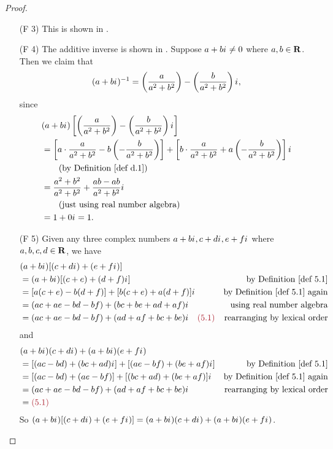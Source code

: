 \begin{proof}
\begin{enumerate}
\item[(F 3)] This is shown in .

\item[(F 4)] The additive inverse is shown in .
Suppose \(a + b{i\mkern1mu} \ne 0\) where \(a, b \in \mathbf{R}\).
Then we claim that
\[
    (a + b{i\mkern1mu})^{-1} = \left( \frac{a}{a^2 + b^2} \right) - \left( \frac{b}{a^2 + b^2} \right){i\mkern1mu},
\]
since
\begin{align*}
    & (a + b\iu) \left[ \left( \frac{a}{a^2 + b^2} \right) - \left( \frac{b}{a^2 + b^2} \right)\iu \right] \\
    & = \left[ a \cdot \frac{a}{a^2 + b^2} - b \left( - \frac{b}{a^2 + b^2} \right) \right] + \left[ b \cdot \frac{a}{a^2 + b^2} + a \left( - \frac{b}{a^2 + b^2} \right) \right] \iu \\
    & \quad \quad \text{(by \DEF{d.1})} \\
    & = \frac{a^2 + b^2}{a^2 + b^2} + \frac{ab - ab}{a^2 + b^2} \iu \\
    & \quad \quad \text{(just using real number algebra)} \\
    & = 1 + 0 \iu = 1.
\end{align*}

\item[(F 5)] Given any three complex numbers \(a + b {i\mkern1mu}, c + d {i\mkern1mu}, e + f {i\mkern1mu}\) where \(a, b, c, d \in \mathbf{R}\), we have
\begin{align*}
    & (a + b\iu)[(c + d\iu) + (e + f\iu)] \\
    & = (a + b\iu)[(c + e) + (d + f)\iu] & \text{by \DEF{5.1}} \\
    & = [a(c + e) - b(d + f)] + [b(c + e) + a(d + f)] \iu & \text{by \DEF{5.1} again} \\
    & = (ac + ae - bd - bf) + (bc + be + ad + af) \iu & \text{using real number algebra} \\
    & = (ac + ae - bd - bf) + (ad + af + bc + be) \iu \quad \MAROON{(5.1)} & \text{rearranging by lexical order} \\
\end{align*}
and
\begin{align*}
    & (a + b\iu)(c + d\iu) + (a + b\iu)(e + f\iu) \\
    & = [(ac - bd) + (bc + ad)\iu] + [(ae - bf) + (be + af)\iu] & \text{by \DEF{5.1}} \\
    & = [(ac - bd) + (ae - bf)] + [(bc + ad) + (be + af)] \iu & \text{by \DEF{5.1} again} \\
    & = (ac + ae - bd - bf) + (ad + af + bc + be) \iu & \text{rearranging by lexical order} \\
    & = \MAROON{(5.1)}
\end{align*}
So \((a + b{i\mkern1mu})[(c + d{i\mkern1mu}) + (e + f{i\mkern1mu})] = (a + b{i\mkern1mu})(c + d{i\mkern1mu}) + (a + b{i\mkern1mu})(e + f{i\mkern1mu})\).
\end{enumerate}
\end{proof}

